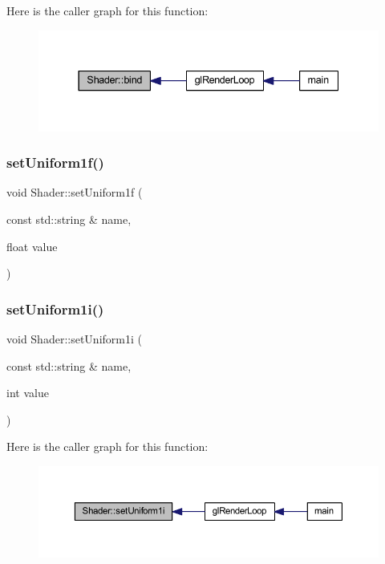 Here is the caller graph for this function\+:
\nopagebreak
\begin{figure}[H]
\begin{center}
\leavevmode
\includegraphics[width=337pt]{class_shader_aadbc0ca0d899238d547f87f19461dfeb_icgraph}
\end{center}
\end{figure}
\mbox{\label{class_shader_a514a718cd4afdbe525cc977963d46c54}} 
\subsubsection{\texorpdfstring{set\+Uniform1f()}{setUniform1f()}}
{\footnotesize\ttfamily void Shader\+::set\+Uniform1f (\begin{DoxyParamCaption}\item[{const std\+::string \&}]{name,  }\item[{float}]{value }\end{DoxyParamCaption})}

\mbox{\label{class_shader_a6a3ad7b19c1b78b851a21dcfb69ed6c2}} 
\subsubsection{\texorpdfstring{set\+Uniform1i()}{setUniform1i()}}
{\footnotesize\ttfamily void Shader\+::set\+Uniform1i (\begin{DoxyParamCaption}\item[{const std\+::string \&}]{name,  }\item[{int}]{value }\end{DoxyParamCaption})}

Here is the caller graph for this function\+:
\nopagebreak
\begin{figure}[H]
\begin{center}
\leavevmode
\includegraphics[width=350pt]{class_shader_a6a3ad7b19c1b78b851a21dcfb69ed6c2_icgraph}
\end{center}
\end{figure}
\mbox{\label{class_shader_a4580a5874d65651a6632d497f9675934}} 
